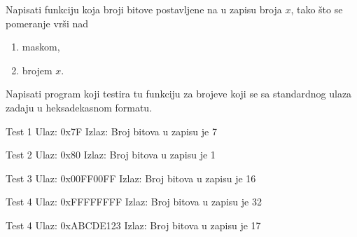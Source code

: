 \begin{Exercise}[label=202]
 Napisati funkciju koja broji bitove postavljene na  u zapisu broja $x$, tako što se pomeranje vrši nad
\begin{enumerate}
\item maskom,
\item brojem $x$.
\end{enumerate} 
 
 Napisati program koji testira tu funkciju za brojeve koji se sa standardnog ulaza zadaju u heksadekasnom formatu.

\begin{minitest}
\begin{test}{Test 1}
Ulaz:   0x7F  
Izlaz:  
  Broj bitova u zapisu je  7   
\end{test}
\end{minitest}
\begin{minitest}
\begin{test}{Test 2}
Ulaz:   0x80
Izlaz:  
  Broj bitova u zapisu je 1
\end{test}
\end{minitest}
\begin{minitest}
\begin{test}{Test 3}
Ulaz:   0x00FF00FF
Izlaz:  
  Broj bitova u zapisu je 16
\end{test}
\end{minitest}

\begin{minitest}
\begin{test}{Test 4}
Ulaz:   0xFFFFFFFF
Izlaz:  
  Broj bitova u zapisu je 32
\end{test}
\end{minitest}
\begin{minitest}
\begin{test}{Test 4}
Ulaz:   0xABCDE123
Izlaz:  
  Broj bitova u zapisu je 17
\end{test}
\end{minitest}

\end{Exercise}
\begin{Answer}[ref=202]
\end{Answer}


